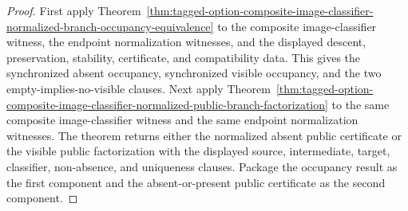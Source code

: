 \begin{proof}
First apply
Theorem~\ref{thm:tagged-option-composite-image-classifier-normalized-branch-occupancy-equivalence}
to the composite image-classifier witness, the endpoint normalization witnesses,
and the displayed descent, preservation, stability, certificate, and
compatibility data. This gives the synchronized absent occupancy, synchronized
visible occupancy, and the two empty-implies-no-visible clauses.
Next apply
Theorem~\ref{thm:tagged-option-composite-image-classifier-normalized-public-branch-factorization}
to the same composite image-classifier witness and the same endpoint
normalization witnesses. The theorem returns either the normalized absent public
certificate or the visible public factorization with the displayed source,
intermediate, target, classifier, non-absence, and uniqueness clauses.
Package the occupancy result as the first component and the absent-or-present
public certificate as the second component.
\end{proof}

